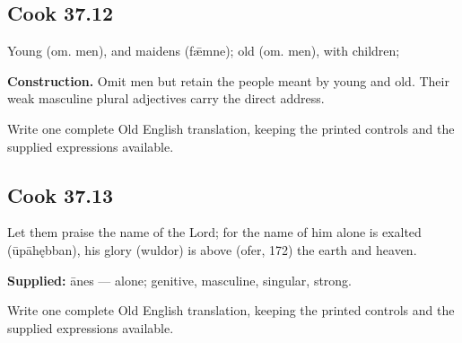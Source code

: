 \par\begin{minipage}{\linewidth}\raggedright
\subsection*{Cook 37.12}

Young (om. men), and maidens (fǣmne); old (om. men), with children;

\textbf{Construction.} Omit men but retain the people meant by young and old. Their weak masculine plural adjectives carry the direct address.

Write one complete Old English translation, keeping the printed controls and the supplied expressions available.

\end{minipage}\par\addvspace{4pt}

\par\begin{minipage}{\linewidth}\raggedright
\subsection*{Cook 37.13}

Let them praise the name of the Lord; for the name of him alone is exalted (ūpāhębban), his glory (wuldor) is above (ofer, 172) the earth and heaven.

\textbf{Supplied:} ānes — alone; genitive, masculine, singular, strong.

Write one complete Old English translation, keeping the printed controls and the supplied expressions available.

\end{minipage}\par\addvspace{4pt}

